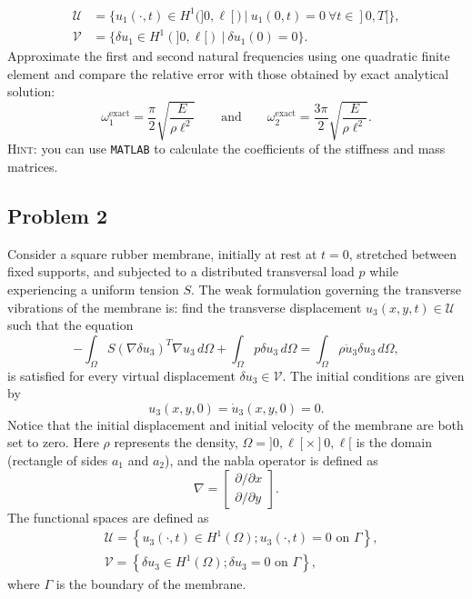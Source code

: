 \documentclass[12pt]{article}
\begin{document}
\begin{align*}
    \mathcal U & =\big\{u_{1}(\cdot,t)\in H^1(]0,\ell[)\ |\  u_1(0,t)=0\ \forall t\in]0,T[\big\}, \\
    \mathcal V & =\big\{\delta u_{1}\in H^1(]0,\ell[)\ |\ \delta u_{1}(0)=0\big\}.
\end{align*}
Approximate the first and second natural frequencies using one quadratic finite element and compare the relative error with those obtained by exact analytical solution:
\begin{equation*}
    \omega_1^{\text{exact}} = \frac{\pi}{2} \sqrt{\frac{E}{\rho \ell^2}}\qquad\text{and}\qquad \omega_2^{\text{exact}} =\frac{3\pi}{2} \sqrt{\frac{E}{\rho \ell^2}}.
\end{equation*}
\textsc{Hint}: you can use \texttt{MATLAB} to calculate the coefficients of the stiffness and mass matrices.

\subsection*{Problem 2}
Consider a square rubber membrane, initially at rest at $t=0$, stretched between fixed supports, and subjected to a distributed transversal load $p$ while experiencing a uniform tension $S$. The weak formulation governing the transverse vibrations of the membrane is: find the transverse displacement  $u_3\left(x, y, t\right) \in\mathcal U$ such that the equation
\[
    -\int_{\Omega} S (\nabla \delta u_3)^{T}\nabla u_3 \, d\Omega + \int_{\Omega} p \delta u_3 \, d\Omega = \int_{\Omega} \rho \ddot{u}_3 \delta u_3 \, d\Omega,
\]
is satisfied for every virtual displacement $\delta u_3 \in\mathcal V$. The  initial conditions are given by
\[
    u_3(x, y, 0) = \dot{u}_3(x, y, 0) = 0.
\]
Notice that the initial displacement and initial velocity of the membrane are both set to zero. Here $\rho$ represents the density, $\Omega = ]0, \ell[ \times ]0, \ell[$ is the domain (rectangle of sides $a_1$ and $a_2$), and the nabla operator is defined as
\[
    \nabla= \begin{bmatrix}
        \partial / \partial x \\
        \partial / \partial y
    \end{bmatrix}.
\]
The functional spaces are defined as
$$\begin{aligned}
         & \mathcal U=\left\{ u_3(\cdot,t) \in H^1(\Omega) ; u_3(\cdot, t)=0 \text{ on } \Gamma\right\}, \\
         & \mathcal V=\left\{\delta u_3 \in H^1(\Omega) ; \delta u_3=0 \text{ on } \Gamma\right\},
    \end{aligned}$$
where $\Gamma$ is the boundary of the membrane.
\end{document}
